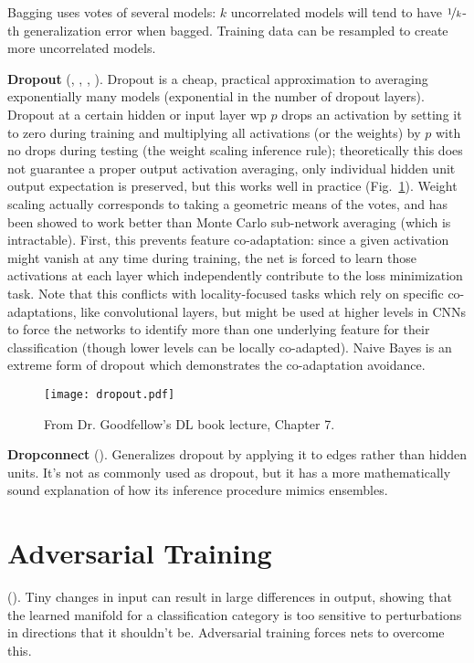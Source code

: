 \documentclass{article}
\begin{document}
Bagging uses votes of several models: $k$ uncorrelated models will tend to have $\nicefrac{1}{k}$-th generalization error when bagged. Training data can be resampled to create more uncorrelated models.

\textbf{Dropout} (, , , ). Dropout is a cheap, practical approximation to averaging exponentially many models (exponential in the number of dropout layers). Dropout at a certain hidden or input layer wp $p$ drops an activation by setting it to zero during training and multiplying all activations (or the weights) by $p$ with no drops during testing (the weight scaling inference rule); theoretically this does not guarantee a proper output activation averaging, only individual hidden unit output expectation is preserved, but this works well in practice (Fig.~\ref{fig:dropout}). Weight scaling actually corresponds to taking a geometric means of the votes, and has been showed to work better than Monte Carlo sub-network averaging (which is intractable). First, this prevents feature co-adaptation: since a given activation might vanish at any time during training, the net is forced to learn those activations at each layer which independently contribute to the loss minimization task. Note that this conflicts with locality-focused tasks which rely on specific co-adaptations, like convolutional layers, but might be used at higher levels in CNNs to force the networks to identify more than one underlying feature for their classification (though lower levels can be locally co-adapted). Naive Bayes is an extreme form of dropout which demonstrates the co-adaptation avoidance.
\begin{figure}[!h]
\centering
{\texttt{[image: dropout.pdf]}}
  \caption{From Dr. Goodfellow's DL book lecture, Chapter 7.}
\label{fig:dropout}
\end{figure}

\textbf{Dropconnect} (). Generalizes dropout by applying it to edges rather than hidden units. It's not as commonly used as dropout, but it has a more mathematically sound explanation of how its inference procedure mimics ensembles.

\section{Adversarial Training}

(). Tiny changes in input can result in large differences in output, showing that the learned manifold for a classification category is too sensitive to perturbations in directions that it shouldn't be. Adversarial training forces nets to overcome this.
\end{document}
